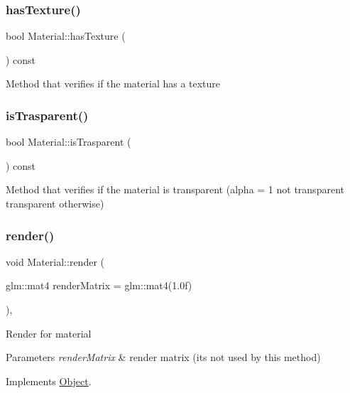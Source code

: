 \subsubsection{\texorpdfstring{has\+Texture()}{hasTexture()}}
{\footnotesize\ttfamily bool Material\+::has\+Texture (\begin{DoxyParamCaption}{ }\end{DoxyParamCaption}) const}

Method that verifies if the material has a texture \mbox{\label{classMaterial_a8e276604d5e764567c85cd770e8df8a7}} 
\subsubsection{\texorpdfstring{is\+Trasparent()}{isTrasparent()}}
{\footnotesize\ttfamily bool Material\+::is\+Trasparent (\begin{DoxyParamCaption}{ }\end{DoxyParamCaption}) const}

Method that verifies if the material is transparent (alpha = 1 not transparent transparent otherwise) \mbox{\label{classMaterial_ada83b9344f974994cd495b8ecda8b049}} 
\subsubsection{\texorpdfstring{render()}{render()}}
{\footnotesize\ttfamily void Material\+::render (\begin{DoxyParamCaption}\item[{glm\+::mat4}]{render\+Matrix = {\ttfamily glm\+:\+:mat4(1.0f)} }\end{DoxyParamCaption})\hspace{0.3cm}{\ttfamily [override]}, {\ttfamily [virtual]}}

Render for material 
\begin{DoxyParams}{Parameters}
{\em render\+Matrix} & render matrix (its not used by this method) \\
\hline
\end{DoxyParams}


Implements \hyperlink{classObject_af7b5e6c789269f331688537c0809fb82}{Object}.

\mbox{\label{classMaterial_a24b7ebf7ebf1236fc96adabade4d014e}} 
